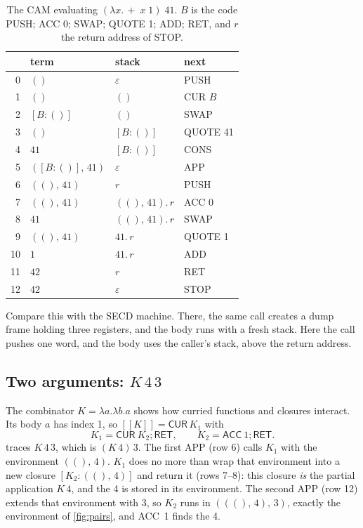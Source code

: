 \documentclass[11pt,a4paper]{article}
\newcommand{\ins}[1]{\textsf{#1}}
\newcommand{\clo}[2]{[#1 : #2]}
\newcommand{\pr}[2]{(#1,\, #2)}
\newcommand{\unit}{()}
\newcommand{\sem}[1]{[\![#1]\!]}
\newcommand{\seq}{\mathbin{;}}
\theoremstyle{definition}
\theoremstyle{plain}
\begin{document}
\begin{table}[t]
\centering
\small
\begin{tabular}{@{}r l l l@{}}
\toprule
& term & stack & next\\
\midrule
0 & $\unit$ & $\varepsilon$ & \ins{PUSH}\\
1 & $\unit$ & $\unit$ & \ins{CUR} $B$\\
2 & $\clo{B}{\unit}$ & $\unit$ & \ins{SWAP}\\
3 & $\unit$ & $\clo{B}{\unit}$ & \ins{QUOTE} 41\\
4 & $41$ & $\clo{B}{\unit}$ & \ins{CONS}\\
5 & $\pr{\clo{B}{\unit}}{41}$ & $\varepsilon$ & \ins{APP}\\
6 & $\pr{\unit}{41}$ & $r$ & \ins{PUSH}\\
7 & $\pr{\unit}{41}$ & $\pr{\unit}{41}.\,r$ & \ins{ACC} 0\\
8 & $41$ & $\pr{\unit}{41}.\,r$ & \ins{SWAP}\\
9 & $\pr{\unit}{41}$ & $41.\,r$ & \ins{QUOTE} 1\\
10 & $1$ & $41.\,r$ & \ins{ADD}\\
11 & $42$ & $r$ & \ins{RET}\\
12 & $42$ & $\varepsilon$ & \ins{STOP}\\
\bottomrule
\end{tabular}
\caption{The CAM evaluating $(\lambda x.\,{+}\;x\;1)\;41$. $B$ is the code
\ins{PUSH; ACC 0; SWAP; QUOTE 1; ADD; RET}, and $r$ the return address of
\ins{STOP}.}
\label{tab:trace1}
\end{table}

Compare this with the SECD machine. There, the same call creates a dump frame
holding three registers, and the body runs with a fresh stack. Here the call
pushes one word, and the body uses the caller's stack, above the return
address.

\subsection{Two arguments: \texorpdfstring{$K\,4\,3$}{K 4 3}}

The combinator $K = \lambda a.\lambda b.a$ shows how curried functions and
closures interact. Its body $a$ has index 1, so $\sem{K} = \ins{CUR}\,K_1$
with
\[
  K_1 = \ins{CUR}\ K_2\seq \ins{RET}, \qquad K_2 = \ins{ACC}\ 1\seq \ins{RET}.
\]
 traces $K\,4\,3$, which is $(K\,4)\,3$. The first \ins{APP}
(row 6) calls $K_1$ with the environment $\pr{\unit}{4}$. $K_1$ does no more
than wrap that environment into a new closure $\clo{K_2}{\pr{\unit}{4}}$ and
return it (rows 7--8): this closure \emph{is} the partial application
$K\,4$, and the 4 is stored in its environment. The second \ins{APP} (row 12)
extends that environment with 3, so $K_2$ runs in $\pr{\pr{\unit}{4}}{3}$,
exactly the environment of \cref{fig:pairs}, and \ins{ACC}~1 finds the 4.
\end{document}
